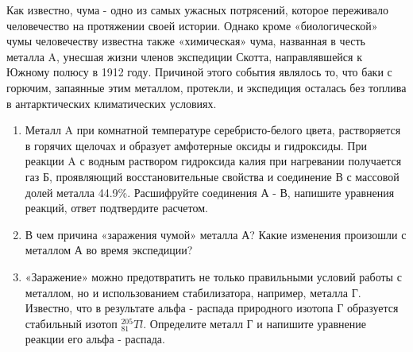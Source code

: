 
Как известно, чума - одно из самых ужасных потрясений, которое переживало человечество на протяжении 
своей истории. Однако кроме «биологической» чумы человечеству известна также «химическая» чума, названная 
в честь металла A, унесшая жизни членов экспедиции Скотта, направлявшейся к Южному полюсу в 1912 году. 
Причиной этого события являлось то, что баки с горючим, запаянные этим металлом, протекли, и экспедиция 
осталась без топлива в антарктических климатических условиях.

\begin{enumerate}
    \item Металл A при комнатной температуре серебристо-белого цвета, растворяется в горячих щелочах и 
    образует амфотерные оксиды и гидроксиды. При реакции A с водным раствором гидроксида калия при нагревании 
    получается газ Б, проявляющий восстановительные свойства и соединение В с массовой долей металла 44.9\%. 
    Расшифруйте соединения А - В, напишите уравнения реакций, ответ подтвердите расчетом.
    \item В чем причина «заражения чумой» металла А? Какие изменения произошли с металлом А во время экспедиции?
    \item «Заражение» можно предотвратить не только  правильными условий работы с металлом, но и использованием 
    стабилизатора, например, металла Г. Известно, что в результате альфа - распада природного изотопа Г 
    образуется стабильный изотоп $_{81}^{205}Tl$. Определите металл Г и напишите уравнение реакции его альфа - распада.
\end{enumerate}